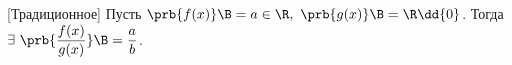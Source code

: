 [Традиционное]
 	Пусть $\prb{f(x)}\B=a\in\R,\ \prb{g(x)}\B=\R\dd\{0\}$. Тогда $\exists\  \prb{\dfrac {f(x)}{g(x)}}\B=\dfrac ab$.
 